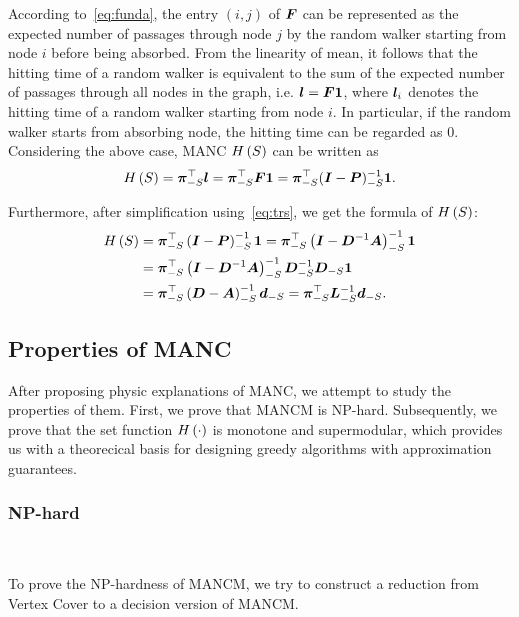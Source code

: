 \documentclass[sigconf]{acmart}
\begin{document}
According to~\eqref{eq:funda}, the entry \((i,j)\) of \(\boldsymbol{F}\) can be represented as the expected number of passages through node \(j\) by the random walker starting from node \(i\) before being absorbed.
From the linearity of mean, it follows that the hitting time of a random walker is equivalent to the sum of the expected number of passages through all nodes in the graph, i.e. \(\boldsymbol{l}=\boldsymbol{F}\boldsymbol{1}\), where \(\boldsymbol{l}_i\) denotes the hitting time of a random walker starting from node \(i\).
In particular, if the random walker starts from absorbing node, the hitting time can be regarded as \(0\).
Considering the above case, MANC \(H\left(S\right)\) can be written as
\[H\left(S\right)=\boldsymbol{\pi}_{-S}^\top\boldsymbol{l}=\boldsymbol{\pi}_{-S}^\top\boldsymbol{F}\boldsymbol{1}=\boldsymbol{\pi}_{-S}^\top(\boldsymbol{I}-\boldsymbol{P})_{-S}^{-1}\boldsymbol{1}.\]

Furthermore, after simplification using~\eqref{eq:trs}, we get the formula of \(H\left(S\right)\):
\begin{equation}\label{eq:MANC}
  \begin{split}
    H\left(S\right) & =\boldsymbol{\pi}_{-S}^\top\left( \boldsymbol{I}-\boldsymbol{P} \right)_{-S}^{-1}\boldsymbol{1}=\boldsymbol{\pi}_{-S}^\top\left( \boldsymbol{I}-\boldsymbol{D}^{-1}\boldsymbol{A} \right)_{-S}^{-1}\boldsymbol{1}                          \\
    & =\boldsymbol{\pi}_{-S}^\top\left( \boldsymbol{I}-\boldsymbol{D}^{-1}\boldsymbol{A} \right)_{-S}^{-1}\boldsymbol{D}_{-S}^{-1}\boldsymbol{D}_{-S}\boldsymbol{1} \\
    & =\boldsymbol{\pi}_{-S}^\top\left( \boldsymbol{D}-\boldsymbol{A} \right)_{-S}^{-1}\boldsymbol{d}_{-S}=\boldsymbol{\pi}_{-S}^\top\boldsymbol{L}_{-S}^{-1}\boldsymbol{d}_{-S}.
  \end{split}
\end{equation}

\subsection{Properties of MANC}

After proposing physic explanations of MANC, we attempt to study the properties of them. First, we prove that MANCM is NP-hard.
Subsequently, we prove that the set function \(H\left(\cdot\right)\) is monotone and supermodular, which provides us with a theorecical basis for designing greedy algorithms with approximation guarantees.

\subsubsection{NP-hard}

\

To prove the NP-hardness of MANCM, we try to construct a reduction from Vertex Cover to a decision version of MANCM.
\end{document}

